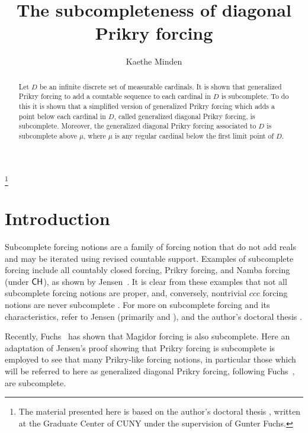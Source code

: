 \documentclass{amsart}
\theoremstyle{definition}
\theoremstyle{remark}
\newcommand{\CH}{\textup{\textsf{CH}}}
\begin{document}
\title{The subcompleteness of diagonal Prikry forcing}
\author{Kaethe Minden}
 \address[K.~Minden]{Mathematics, Marlboro College, 2582 South Road, Marlboro, VT 05344}
\date{}     					
\thanks{The material presented here is based on the author's doctoral thesis \cite{Minden:2017fr}, written at the Graduate Center of CUNY under the supervision of Gunter Fuchs.}

\begin{abstract}
Let \(D\) be an infinite discrete set of measurable cardinals. It is shown that generalized Prikry forcing to add a countable sequence to each cardinal in \(D\) is subcomplete. To do this it is shown that a simplified version of generalized Prikry forcing which adds a point below each cardinal in \(D\), called generalized diagonal Prikry forcing, is subcomplete. Moreover, the generalized diagonal Prikry forcing associated to \(D\) is subcomplete above $\mu$, where $\mu$ is any regular cardinal below the first limit point of \(D\).
\end{abstract}
\maketitle
\section{Introduction}
Subcomplete forcing notions are a family of forcing notion that do not add reals and may be iterated using revised countable support. Examples of subcomplete forcing include all countably closed forcing, Prikry forcing, and Namba forcing (under $\CH$), as shown by Jensen~\cite[Section 3.3]{Jensen:2014}. It is clear from these examples that not all subcomplete forcing notions are proper,
and, conversely, nontrivial $ccc$ forcing notions are never subcomplete \cite{Minden:2017fr}. For more on subcomplete forcing and its characteristics, refer to Jensen (primarily \cite{Jensen:2014} and \cite{Jensen:2009fe}), and the author's doctoral thesis \cite{Minden:2017fr}.

Recently, Fuchs~\cite{Fuchs:2017Magidor} has shown that Magidor forcing is also subcomplete. Here an adaptation of Jensen's proof showing that Prikry forcing is subcomplete is employed to see that many Prikry-like forcing notions, in particular those which will be referred to here as generalized diagonal Prikry forcing, following Fuchs~\cite{Fuchs:2005kx}, are subcomplete.
\end{document}
